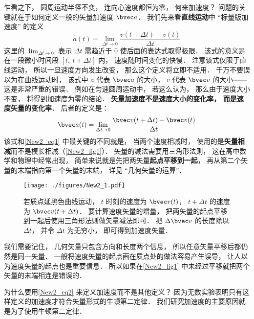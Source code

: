 乍看之下， 圆周运动半径不变， 连向心速度都恒为零， 何来加速度？ 问题的关键就在于如何定义一般的矢量加速度 $\bvec a$． 我们先来看\textbf{直线运动}中 “标量版加速度” 的定义
\begin{equation}\label{New2_eq1}
a(t) = \lim_{\Delta t\to 0}\frac{v(t+\Delta t) - v(t)}{\Delta t}
\end{equation}
这里的 $\lim_{\Delta t\to 0}$ 表示 $\Delta t$ 需趋近于 0 使后面的表达式取得极限． 该式的意义是在一段微小时间段 $[t,\ t+\Delta t]$ 内， 速度随时间变化的快慢． 注意该式仅限于直线运动， 所以一旦速度方向发生改变， 那么这个定义将立即不适用． 千万不要误以为在曲线运动时， 该式中 $a$ 代表 $\bvec a$ 的大小， $v$ 代表 $\bvec v$ 的大小——这是非常严重的错误． 例如在匀速圆周运动中， 若这么认为， 那么由于速度大小不变， 将得到加速度为零的结论． \textbf{矢量加速度不是速度大小的变化率， 而是速度矢量的变化率}． 后者的定义是：
\begin{equation}\label{New2_eq2}
\bvec a(t) = \lim_{\Delta t\to 0}\frac{\bvec v(t+\Delta t) - \bvec v(t)}{\Delta t}
\end{equation}
该式和\autoref{New2_eq1} 中最关键的不同就是， 当两个速度相减时， 使用的是\textbf{矢量相减}而不是模长相减（\autoref{New2_fig1}）． 矢量的减法需要用三角形法则， 这在高中数学和物理中经常出现， 简单来说就是先把两矢量\textbf{起点平移到一起}， 再从第二个矢量的末端指向第一个矢量的末端， 详见 “几何矢量的运算”．

\begin{figure}[ht]
\centering
\texttt{[image: ./figures/New2\_1.pdf]}
\caption{若质点延黑色曲线运动， $t$ 时刻的速度为 $\bvec v(t)$， $t+\Delta t$ 的速度为 $\bvec v(t+\Delta t)$． 要计算速度矢量的增量， 把两矢量的起点平移到一起后使用三角形法则做矢量减法即可． 把 $\Delta \bvec v$ 的长度除以 $\Delta t$， 并令 $\Delta t$ 为无穷小， 即可得到加速度矢量．} \label{New2_fig1}
\end{figure}

我们需要记住， 几何矢量只包含方向和长度两个信息， 所以任意矢量平移后都仍然是同一矢量． 一般将速度矢量的起点画在质点处的做法容易产生误导， 让人以为速度矢量的起点也是重要信息． 所以如果在\autoref{New2_fig1} 中未经过平移就把两个矢量的末端相连是错误的．

为什么要用\autoref{New2_eq2} 来定义加速度而不是其他定义？ 因为无数实验表明只有这样定义的加速度才符合矢量形式的牛顿第二定律． 我们研究加速度的主要原因就是为了使用牛顿第二定律．

